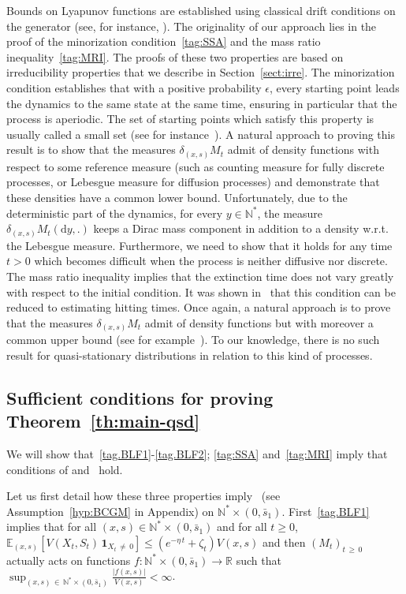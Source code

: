 \documentclass[10pt]{amsart}
\theoremstyle{definition}\newtheorem{defi}[theo]{Definition}\newtheorem{rema}[theo]{Remark}\newtheorem{exam}[theo]{Example}\newtheorem{exem}[theo]{Example}\newtheorem{nota}[theo]{Notation}
\newcommand{\RR}{\mathbb{R}}
\newcommand{\NN}{\mathbb{N}}
\newcommand{\EE}{\mathbb{E}}
\newcommand{\X}{\NN^* \times (0,\bar s_1)}
\newcommand{\dif}{\mathrm{d}}
\newcommand{\1}{\mathbf{1}}
\begin{document}
Bounds on Lyapunov functions are established using classical drift conditions on the generator (see, for instance, \cite[Section~2.4]{BCGM}). The originality of our approach lies in the proof of the minorization condition~\eqref{tag:SSA} and the mass ratio inequality~\eqref{tag:MRI}. The proofs of these two properties are based on irreducibility properties that we describe in Section~\ref{sect:irre}. The minorization condition establishes that with a positive probability $\epsilon$, every starting point leads the dynamics to the same state at the same time, ensuring in particular that the process is aperiodic. The set of starting points which satisfy this property is usually called a small set (see for instance~\cite{MT12}). A natural approach to proving this result is to show that the measures $\delta_{(x,s)} M_t$ admit of density functions with respect to some reference measure (such as counting measure for fully discrete processes, or Lebesgue measure for diffusion processes) and demonstrate that these densities have a common lower bound. Unfortunately, due to the deterministic part of the dynamics, for every $y\in\NN^*$, the measure $\delta_{(x,s)} M_t(\dif y,.)$ keeps a Dirac mass component in addition to a density w.r.t. the Lebesgue measure. Furthermore, we need to show that it holds for any time $t>0$ which becomes difficult when the process is neither diffusive nor discrete. The mass ratio inequality implies that the extinction time does not vary greatly with respect to the initial condition. It was shown in~\cite{CG20} that this condition can be reduced to estimating hitting times. Once again, a natural approach is to prove that the measures $\delta_{(x,s)} M_t$ admit of density functions but with moreover a common upper bound (see for example~\cite{berglund2012mixed}). To our knowledge, there is no such result for quasi-stationary distributions in relation to this kind of processes.



\subsection{Sufficient conditions for proving Theorem~\ref{th:main-qsd}}\label{sec:sufficient.conditions}


We will show that~\eqref{tag.BLF1}-\eqref{tag.BLF2}; \eqref{tag:SSA} and~\eqref{tag:MRI} imply that conditions of \cite[Theorem~5.1]{BCGM} and~\cite[Corollary~2.4]{CV20} hold.



Let us first detail how these three properties imply~\cite[Assumption~A]{BCGM} (see Assumption~\ref{hyp:BCGM} in Appendix) on $\X$. First~\eqref{tag.BLF1} implies that for all $(x,s)\in \X$ and for all $t\geq 0$, $\EE_{(x,s)}[V(X_t, S_t)\,\1_{X_t\,\neq\,0}]\leq (e^{-\eta\,t}+\zeta_t)V(x,s)$ and then $(M_t)_{t\,\geq\,0}$ actually acts on functions $f:\NN^*\times (0, \bar s_1) \to \RR$ such that $\sup_{(x,s)\,\in\,\NN^*\times (0, \bar s_1)}\frac{|f(x,s)|}{V(x,s)}<\infty$.
\end{document}
